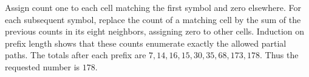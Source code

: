 Assign count one to each cell matching the first symbol and zero elsewhere. For each subsequent symbol, replace the count of a matching cell by the sum of the previous counts in its eight neighbors, assigning zero to other cells. Induction on prefix length shows that these counts enumerate exactly the allowed partial paths. The totals after each prefix are $7,14,16,15,30,35,68,173,178$. Thus the requested number is $\boxed{178}$.
